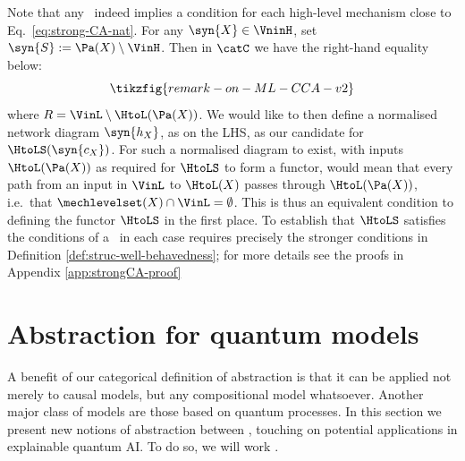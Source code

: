 \documentclass{article}
\begin{document}
\begin{remark}
	Note that any \CCA\ indeed implies a condition for each high-level mechanism close to Eq.~\eqref{eq:strong-CA-nat}. For any $\syn{X} \in \VninH$, set $\syn{S}:=\Pa(X) \setminus \VinH$. Then in $\catC$ we have the right-hand equality below:  
	\begin{equation}
		\tikzfig{remark-on-ML-CCA-v2} 
	\end{equation}
where $R = \VinL \setminus \HtoL(\Pa(X))$. We would like to then define a normalised network diagram $\syn{h_X}$, as on the LHS, as our candidate for $\HtoLS(\syn{c_X})$. For such a normalised diagram to exist, with inputs $\HtoL(\Pa(X))$ as required for $\HtoLS$ to form a functor, would mean that every path from an input in $\VinL$ to $\HtoL(X)$ passes through $\HtoL(\Pa(X))$, i.e.~that $\mechlevelset(X) \cap \VinL = \emptyset$. 
This is thus an equivalent condition to defining the functor $\HtoLS$ in the first place. To establish that $\HtoLS$ satisfies the conditions of a \strongCCA~in each case requires precisely the stronger conditions in Definition \ref{def:struc-well-behavedness}; for more details see the proofs in Appendix \ref{app:strongCA-proof} 
\end{remark}


\section{Abstraction for quantum models} \label{sec:quantum-abstraction}

A benefit of our categorical definition of abstraction is that it can be applied not merely to causal models, but any compositional model whatsoever. Another major class of models are those based on quantum processes. In this section we present new notions of abstraction between , touching on potential applications in explainable quantum AI. To do so, we will work .
\end{document}
